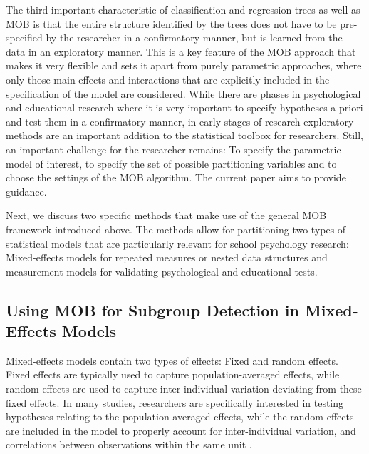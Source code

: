 \documentclass[doc,floatsintext,natbib]{apa7}
\begin{document}
The third important characteristic of classification and regression trees as well as MOB is that the entire structure identified by the trees does not have to be pre-specified by the researcher in a confirmatory manner, but is learned from the data in an exploratory manner. This is a key feature of the MOB approach that makes it very flexible and sets it apart from purely parametric approaches, where only those main effects and interactions that are explicitly included in the specification of the model are considered. While there are phases in psychological and educational research where it is very important to specify hypotheses a-priori and test them in a confirmatory manner, in early stages of research exploratory methods are an important addition to the statistical toolbox for researchers. Still, an important challenge for the researcher remains: To specify the parametric model of interest, to specify the set of possible partitioning variables and to choose the settings of the MOB algorithm. The current paper aims to provide guidance. 

Next, we discuss two specific methods that make use of the general MOB framework introduced above. The methods allow for partitioning two types of statistical models that are particularly relevant for school psychology research: Mixed-effects models for repeated measures or nested data structures and measurement models for validating psychological and educational tests. 

\subsection{Using MOB for Subgroup Detection in Mixed-Effects Models}

Mixed-effects models contain two types of effects: Fixed and random effects. Fixed effects are typically used to capture population-averaged effects, while random effects are used to capture inter-individual variation deviating from these fixed effects. In many studies, researchers are specifically interested in testing hypotheses relating to the population-averaged effects, while the random effects are included in the model to properly account for inter-individual variation, and correlations between observations within the same unit \citep{RaudyBush02}.
\end{document}
